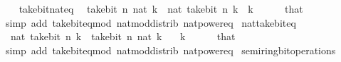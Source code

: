 \begin{isabellebody}
\ \ \isamarkupfalse%
%
\endisatagproof
{\isafoldproof}%
%
\isadelimproof
\isanewline
%
\endisadelimproof
\isanewline
{}\isamarkupfalse%
\ take{\isacharunderscore}{\kern0pt}bit{\isacharunderscore}{\kern0pt}nat{\isacharunderscore}{\kern0pt}eq{\isacharcolon}{\kern0pt}\isanewline
\ \ {\isacartoucheopen}take{\isacharunderscore}{\kern0pt}bit\ n\ {\isacharparenleft}{\kern0pt}nat\ k{\isacharparenright}{\kern0pt}\ {\isacharequal}{\kern0pt}\ nat\ {\isacharparenleft}{\kern0pt}take{\isacharunderscore}{\kern0pt}bit\ n\ k{\isacharparenright}{\kern0pt}{\isacartoucheclose}\ \ {\isacartoucheopen}k\ {\isasymge}\ {}{\isacartoucheclose}\isanewline
%
\isadelimproof
\ \ %
\endisadelimproof
%
\isatagproof
{}\isamarkupfalse%
\ that\ \isamarkupfalse%
\ {\isacharparenleft}{\kern0pt}simp\ add{\isacharcolon}{\kern0pt}\ take{\isacharunderscore}{\kern0pt}bit{\isacharunderscore}{\kern0pt}eq{\isacharunderscore}{\kern0pt}mod\ nat{\isacharunderscore}{\kern0pt}mod{\isacharunderscore}{\kern0pt}distrib\ nat{\isacharunderscore}{\kern0pt}power{\isacharunderscore}{\kern0pt}eq{\isacharparenright}{\kern0pt}%
\endisatagproof
{\isafoldproof}%
%
\isadelimproof
\isanewline
%
\endisadelimproof
\isanewline
{}\isamarkupfalse%
\ nat{\isacharunderscore}{\kern0pt}take{\isacharunderscore}{\kern0pt}bit{\isacharunderscore}{\kern0pt}eq{\isacharcolon}{\kern0pt}\isanewline
\ \ {\isacartoucheopen}nat\ {\isacharparenleft}{\kern0pt}take{\isacharunderscore}{\kern0pt}bit\ n\ k{\isacharparenright}{\kern0pt}\ {\isacharequal}{\kern0pt}\ take{\isacharunderscore}{\kern0pt}bit\ n\ {\isacharparenleft}{\kern0pt}nat\ k{\isacharparenright}{\kern0pt}{\isacartoucheclose}\isanewline
\ \ \ {\isacartoucheopen}k\ {\isasymge}\ {}{\isacartoucheclose}\isanewline
%
\isadelimproof
\ \ %
\endisadelimproof
%
\isatagproof
{}\isamarkupfalse%
\ that\ \isamarkupfalse%
\ {\isacharparenleft}{\kern0pt}simp\ add{\isacharcolon}{\kern0pt}\ take{\isacharunderscore}{\kern0pt}bit{\isacharunderscore}{\kern0pt}eq{\isacharunderscore}{\kern0pt}mod\ nat{\isacharunderscore}{\kern0pt}mod{\isacharunderscore}{\kern0pt}distrib\ nat{\isacharunderscore}{\kern0pt}power{\isacharunderscore}{\kern0pt}eq{\isacharparenright}{\kern0pt}%
\endisatagproof
{\isafoldproof}%
%
\isadelimproof
\isanewline
%
\endisadelimproof
\isanewline
{}\isamarkupfalse%
\ semiring{\isacharunderscore}{\kern0pt}bit{\isacharunderscore}{\kern0pt}operations\isanewline
{}\isanewline
\isanewline
{}\isamarkupfalse%

\end{isabellebody}
